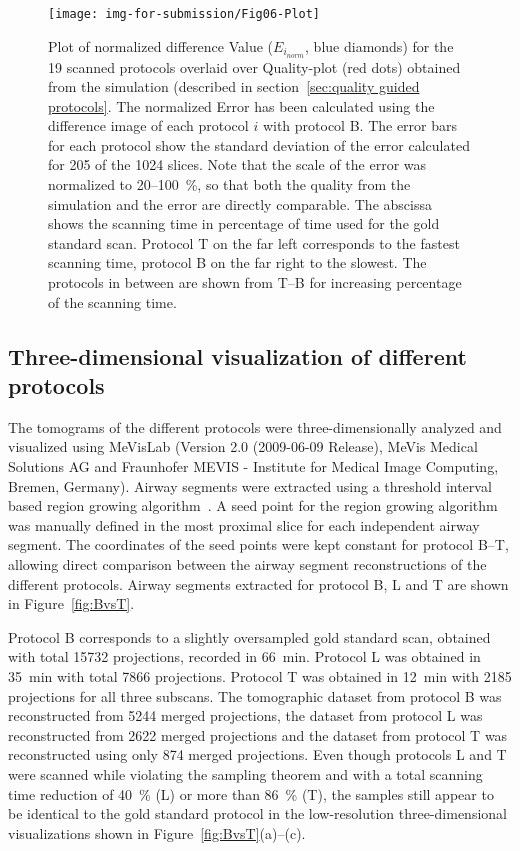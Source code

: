 \begin{figure}
	\centering
	\caption{Plot of normalized difference Value ($E_{i_{norm}}$, blue diamonds) for the 19 scanned protocols overlaid over Quality-plot (red dots) obtained from the simulation (described in section~\ref{sec:quality guided protocols}. The normalized Error has been calculated using the difference image of each protocol $i$ with protocol B. The error bars for each protocol show the standard deviation of the error calculated for 205 of the 1024 slices. Note that the scale of the error was normalized to 20--\SI{100}{\percent}, so that both the quality from the simulation and the error are directly comparable. The abscissa shows the scanning time in percentage of time used for the gold standard scan. Protocol T on the far left corresponds to the fastest scanning time, protocol B on the far right to the slowest. The protocols in between are shown from T--B for increasing percentage of the scanning time.}
	\texttt{[image: img-for-submission/Fig06-Plot]}
	\label{fig:NormalizedErrorPlot}
\end{figure}

\subsection{Three-dimensional visualization of different protocols}
\label{subsec:comparison}
The tomograms of the different protocols were three-dimensionally analyzed and visualized using MeVisLab (Version 2.0 (2009-06-09 Release), MeVis Medical Solutions AG and Fraunhofer MEVIS - Institute for Medical Image Computing, Bremen, Germany). Airway segments were extracted using a threshold interval based region growing algorithm~\cite{Zucker1976}. A seed point for the region growing algorithm was manually defined in the most proximal slice for each independent airway segment. The coordinates of the seed points were kept constant for protocol B--T, allowing direct comparison between the airway segment reconstructions of the different protocols. Airway segments extracted for protocol B, L and T are shown in Figure~\ref{fig:BvsT}.

Protocol B corresponds to a slightly oversampled gold standard scan, obtained with total 15732 projections, recorded in \SI{66}{\minute}. Protocol L was obtained in \SI{35}{\minute} with total 7866 projections. Protocol T was obtained in \SI{12}{\minute} with 2185 projections for all three subscans. The tomographic dataset from protocol B was reconstructed from 5244 merged projections, the dataset from protocol L was reconstructed from 2622 merged projections and the dataset from protocol T was reconstructed using only 874 merged projections. Even though protocols L and T were scanned while violating the sampling theorem and with a total scanning time reduction of \SI{40}{\percent} (L) or more than \SI{86}{\percent} (T), the samples still appear to be identical to the gold standard protocol in the low-resolution three-dimensional visualizations shown in Figure~\ref{fig:BvsT}(a)--(c).

